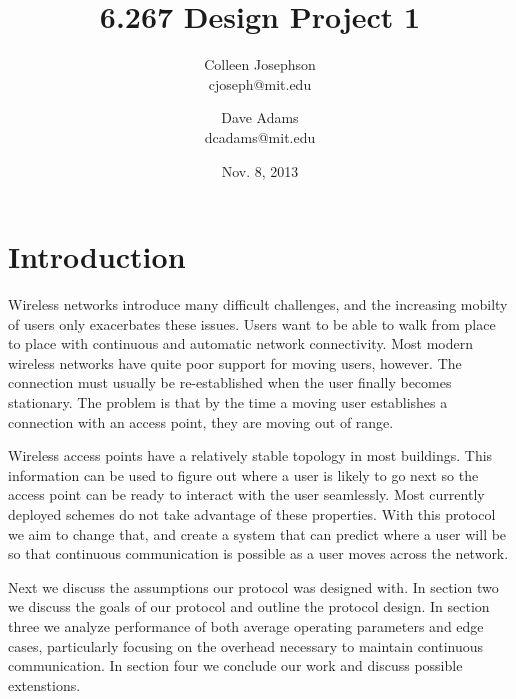 \documentclass[letterpaper,12pt]{article}
\begin{document}
\title{\Large \bf 6.267 Design Project 1}
\author{
{\rm Colleen Josephson}\\
cjoseph@mit.edu
\and
{\rm Dave Adams}\\
dcadams@mit.edu
} %

\date{Nov. 8, 2013}

\maketitle


\section{Introduction}

Wireless networks introduce many difficult challenges, and the increasing 
mobilty of users only exacerbates these issues. Users want to be able to walk 
from place to place with continuous and automatic network connectivity. Most
modern wireless networks have quite poor support for moving users, however.
The connection must usually be re-established when the user finally becomes
stationary. The problem is that by the time a moving user establishes a 
connection with an access point, they are moving out of range. 

Wireless access points have a relatively stable topology in most buildings.
This information can be used to figure out where a user is likely to go 
next so the access point can be ready to interact with the user seamlessly.
Most currently deployed schemes do not take advantage of these properties.
With this protocol we aim to change that, and create a system that can 
predict where a user will be so that continuous communication is possible as
a user moves across the network. 

Next we discuss the assumptions our protocol was designed with.
In section two we discuss the goals of our protocol and outline the protocol
design. In section three we analyze performance of both average operating
parameters and edge cases, particularly focusing on the overhead necessary
to maintain continuous communication. In section four we conclude our work
and discuss possible extenstions.
\end{document}
